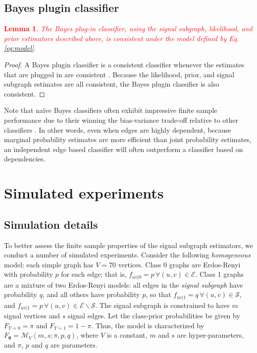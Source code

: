 \documentclass[10pt,journal,cspaper,compsoc]{IEEEtran}
\providecommand{\tr}[1]{\textcolor{red}{#1}}
\providecommand{\ve}[1]{\boldsymbol{#1}}
\newcommand{\bth}{\ve{\theta}}
\providecommand{\mc}[1]{\mathcal{#1}}
\newtheorem{Lem}{Lemma}[section]
\begin{document}
\subsection{Bayes plugin classifier}

\tr{\begin{Lem}
	The Bayes plug-in classifier, using the signal subgraph, likelihood, and prior estimators described above, is consistent under the model defined by Eq. \eqref{eq:model}.
\end{Lem}
}
 
\begin{proof}
A Bayes plugin classifier is a consistent classifier whenever the estimates that are plugged in are consistent \cite{Bickel2000}.  Because the likelihood, prior, and signal subgraph estimates are all consistent, the Bayes plugin classifier is also consistent.  
\end{proof}

Note that na\"ive Bayes classifiers often exhibit impressive finite sample performance due to their winning the bias-variance trade-off relative to other classifiers \cite{Hand2001}.  In other words, even when edges are highly dependent, because marginal probability estimates are more efficient than joint probability estimates, an independent edge based classifier will often outperform a classifier based on dependencies.






\section{Simulated experiments} %
\label{sub:subsection_name}

\subsection{Simulation details} %
\label{sub:simulation_details}

To better assess the finite sample properties of the signal subgraph estimators, we conduct a number of simulated experiments.  Consider the following \emph{homogeneous} model: each simple graph has $V=70$ vertices.  Class 0 graphs are Erdos-Renyi with probability $p$ for each edge; that is, $f_{uv|0}=p \, \forall (u,v) \in \mc{E}$.  Class 1 graphs are a mixture of two Erdos-Renyi models: all edges in the \emph{signal subgraph} have probability $q$, and all others have probability $p$, so that $f_{uv|1}=q \, \forall (u,v) \in \mc{S}$, and $f_{uv|1}=p \, \forall (u,v) \in \mc{E} \backslash \mc{S}$.  The signal subgraph is constrained to have $m$ signal vertices and $s$ signal edges.  Let the class-prior probabilities be given by $F_{Y=0}=\pi$ and $F_{Y=1}=1-\pi$. Thus, the model is characterized by $F_{\bth}=\mc{M}_V(m,s; \pi,p,q)$, where $V$ is a constant, $m$ and $s$ are hyper-parameters, and $\pi$, $p$ and $q$ are parameters.  
\end{document}
